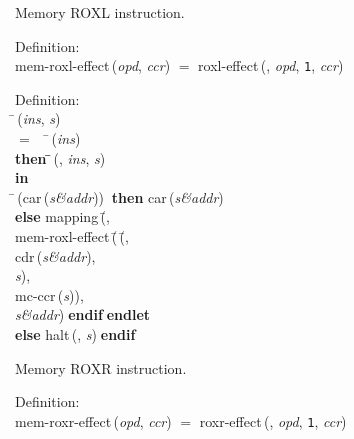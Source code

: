  Memory ROXL instruction.
\begin{tabbing}{\sc Definition}: \\  
{\rm{mem-roxl-effect}}\,({\it{opd\/}}, {\it{ccr\/}}) $=$ {\rm{roxl-effect}}\,({}, {\it{opd\/}}, {\tt{1}}, {\it{ccr\/}})
\end{tabbing}

\begin{tabbing}{\sc Definition}: \\  
\=\,({\it{ins\/}}, {\it{s\/}}) \\ 
$=$$\;\;\;\;$\=\,({\it{ins\/}}) \\ 
{\bf then }\=\=\,({}, {\it{ins\/}}, {\it{s\/}})\- \\ 
{\bf in} \\ 
\=\,({\rm{car}}\,({\it{s\&addr\/}}))$\;\;${\bf then }{\rm{car}}\,({\it{s\&addr\/}}) \\ 
{\bf else }{\rm{mapping}}\,(\=, \\ 
{\rm{mem-roxl-effect}}\,(\=\,(\=, \\ 
{\rm{cdr}}\,({\it{s\&addr\/}}), \\ 
{\it{s\/}})\-, \\ 
{\rm{mc-ccr}}\,({\it{s\/}}))\-, \\ 
{\it{s\&addr\/}})\-$\;${\bf  endif}\-$\;${\bf  endlet}\- \\ 
{\bf else }{\rm{halt}}\,({}, {\it{s\/}})$\;${\bf  endif}\-\-
\end{tabbing}

 Memory ROXR instruction.
\begin{tabbing}{\sc Definition}: \\  
{\rm{mem-roxr-effect}}\,({\it{opd\/}}, {\it{ccr\/}}) $=$ {\rm{roxr-effect}}\,({}, {\it{opd\/}}, {\tt{1}}, {\it{ccr\/}})
\end{tabbing}

